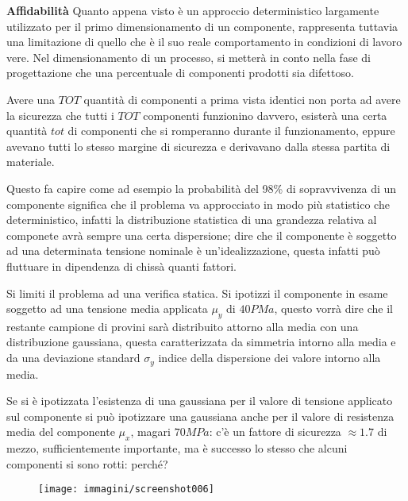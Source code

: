 \documentclass{article}
\begin{document}
\begin{adjustwidth}{2in}{}
     	\textbf{\Large Affidabilità} \newline 
     	Quanto appena visto è un approccio deterministico largamente utilizzato per il primo dimensionamento di un componente, rappresenta tuttavia una limitazione di quello che è il suo reale comportamento in condizioni di lavoro vere. Nel dimensionamento di un processo, si metterà in conto nella fase di progettazione che una percentuale di componenti prodotti sia difettoso.
     	
     	Avere una $ TOT $ quantità di componenti a prima vista identici non porta ad avere la sicurezza che tutti i $ TOT $ componenti funzionino davvero, esisterà una certa quantità $ tot $ di componenti che si romperanno durante il funzionamento, eppure avevano tutti lo stesso margine di sicurezza e derivavano dalla stessa partita di materiale. 
     	
     	Questo fa capire come ad esempio la probabilità del 98\% di sopravvivenza di un componente significa che il problema va approcciato in modo più statistico che deterministico, infatti la distribuzione statistica di una grandezza relativa al componete avrà sempre una certa dispersione; dire che il componente è soggetto ad una determinata tensione nominale è un'idealizzazione, questa infatti può fluttuare in dipendenza di chissà quanti fattori. \newline
     	
     	Si limiti il problema ad una verifica statica.
     	Si ipotizzi il componente in esame soggetto ad una tensione media applicata $\mu_y$ di $ 40PMa $, questo vorrà dire che il restante campione di provini sarà distribuito attorno alla media con una distribuzione gaussiana, questa caratterizzata da simmetria intorno alla media e da una deviazione standard $\sigma_y$ indice della dispersione dei valore intorno alla media. 
     	
     	
     	Se si è ipotizzata l'esistenza di una gaussiana per il valore di tensione applicato sul componente si può ipotizzare una gaussiana anche per il valore di resistenza media del componente $\mu_x$, magari $ 70MPa $: c'è un fattore di sicurezza $\approx 1.7$ di mezzo, sufficientemente importante, ma è successo lo stesso che alcuni componenti si sono rotti: perché? 
     	
     	\begin{figure}[H]
     		\centering
     		\texttt{[image: immagini/screenshot006]}
     		\label{fig:screenshot006}
     	\end{figure}
     	

\end{adjustwidth}
\end{document}
